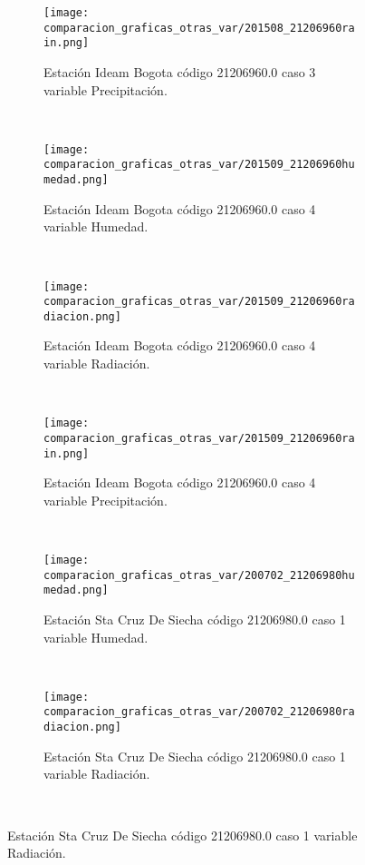 \begin{figure}[H]
\centering
\begin{subfigure}[normla]{0.4\textwidth}
\caption{Estación Ideam Bogota código 21206960.0 caso 3 variable Precipitación.}
\texttt{[image: comparacion\_graficas\_otras\_var/201508\_21206960rain.png]}
\end{subfigure}
~
\begin{subfigure}[normla]{0.4\textwidth}
\caption{Estación Ideam Bogota código 21206960.0 caso 4 variable Humedad.}
\texttt{[image: comparacion\_graficas\_otras\_var/201509\_21206960humedad.png]}
\end{subfigure}
~
\begin{subfigure}[normla]{0.4\textwidth}
\caption{Estación Ideam Bogota código 21206960.0 caso 4 variable Radiación.}
\texttt{[image: comparacion\_graficas\_otras\_var/201509\_21206960radiacion.png]}
\end{subfigure}
~
\begin{subfigure}[normla]{0.4\textwidth}
\caption{Estación Ideam Bogota código 21206960.0 caso 4 variable Precipitación.}
\texttt{[image: comparacion\_graficas\_otras\_var/201509\_21206960rain.png]}
\end{subfigure}
~
\begin{subfigure}[normla]{0.4\textwidth}
\caption{Estación Sta Cruz De Siecha código 21206980.0 caso 1 variable Humedad.}
\texttt{[image: comparacion\_graficas\_otras\_var/200702\_21206980humedad.png]}
\end{subfigure}
~
\begin{subfigure}[normla]{0.4\textwidth}
\caption{Estación Sta Cruz De Siecha código 21206980.0 caso 1 variable Radiación.}
\texttt{[image: comparacion\_graficas\_otras\_var/200702\_21206980radiacion.png]}
\end{subfigure}
~
\end{figure}
           
